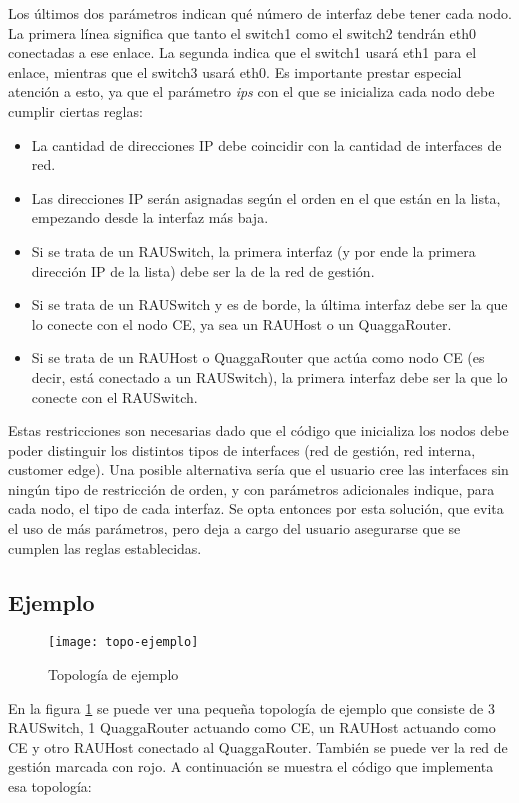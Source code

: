 Los últimos dos parámetros indican qué número de interfaz debe tener cada nodo. La primera línea significa que tanto el switch1 como el switch2 tendrán eth0 conectadas a ese enlace. La segunda indica que el switch1 usará eth1 para el enlace, mientras que el switch3 usará eth0. Es importante prestar especial atención a esto, ya que el parámetro \textit{ips} con el que se inicializa cada nodo debe cumplir ciertas reglas:
\begin{itemize}
	\item La cantidad de direcciones IP debe coincidir con la cantidad de interfaces de red.
	\item Las direcciones IP serán asignadas según el orden en el que están en la lista, empezando desde la interfaz más baja.
	\item Si se trata de un RAUSwitch, la primera interfaz (y por ende la primera dirección IP de la lista) debe ser la de la red de gestión.
	\item Si se trata de un RAUSwitch y es de borde, la última interfaz debe ser la que lo conecte con el nodo CE, ya sea un RAUHost o un QuaggaRouter.
	\item Si se trata de un RAUHost o QuaggaRouter que actúa como nodo CE (es decir, está conectado a un RAUSwitch), la primera interfaz debe ser la que lo conecte con el RAUSwitch.
\end{itemize}

Estas restricciones son necesarias dado que el código que inicializa los nodos debe poder distinguir los distintos tipos de interfaces (red de gestión, red interna, customer edge). Una posible alternativa sería que el usuario cree las interfaces sin ningún tipo de restricción de orden, y con parámetros adicionales indique, para cada nodo, el tipo de cada interfaz. Se opta entonces por esta solución, que evita el uso de más parámetros, pero deja a cargo del usuario asegurarse que se cumplen las reglas establecidas.

\subsection{Ejemplo}
\begin{figure}[t]
	\caption{Topología de ejemplo}
	\texttt{[image: topo-ejemplo]}
	\centering
	\label{fig:topo_ejemplo}
\end{figure}

En la figura \ref{fig:topo_ejemplo} se puede ver una pequeña topología de ejemplo que consiste de 3 RAUSwitch, 1 QuaggaRouter actuando como CE, un RAUHost actuando como CE y otro RAUHost conectado al QuaggaRouter. También se puede ver la red de gestión marcada con rojo. A continuación se muestra el código que implementa esa topología:

